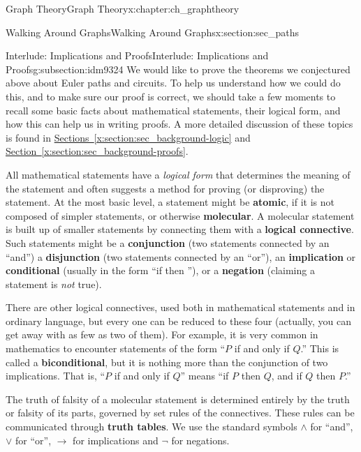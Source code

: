 \documentclass[oneside,10pt,]{book}
\newcommand{\terminology}[1]{\textbf{#1}}
\numberwithin{equation}{chapter}
\def\imp{\rightarrow}
\begin{document}
\begin{chapterptx}{Graph Theory}{}{Graph Theory}{}{}{x:chapter:ch_graphtheory}
\begin{sectionptx}{Walking Around Graphs}{}{Walking Around Graphs}{}{}{x:section:sec_paths}
\typeout{************************************************}
%
\begin{subsectionptx}{Interlude: Implications and Proofs}{}{Interlude: Implications and Proofs}{}{}{g:subsection:idm9324}
We would like to prove the theorems we conjectured above about Euler paths and circuits.  To help us understand how we could do this, and to make sure our proof is correct, we should take a few moments to recall some basic facts about mathematical statements, their logical form, and how this can help us in writing proofs.  A more detailed discussion of these topics is found in \hyperref[x:section:sec_background-logic]{Sections~\ref{x:section:sec_background-logic}} and \hyperref[x:section:sec_background-proofs]{Section~\ref{x:section:sec_background-proofs}}.%
\par
All mathematical statements have a \emph{logical form} that determines the meaning of the statement and often suggests a method for proving (or disproving) the statement.  At the most basic level, a statement might be \terminology{atomic}, if it is not composed of simpler statements, or otherwise \terminology{molecular}.  A molecular statement is built up of smaller statements by connecting them with a \terminology{logical connective}. Such statements might be a \terminology{conjunction} (two statements connected by an ``and'') a \terminology{disjunction} (two statements connected by an ``or''), an \terminology{implication} or \terminology{conditional} (usually in the form ``if \textellipsis{} then \textellipsis{}''), or a \terminology{negation} (claiming a statement is \emph{not} true).%
\par
There are other logical connectives, used both in mathematical statements and in ordinary language, but every one can be reduced to these four (actually, you can get away with as few as two of them).   For example, it is very common in mathematics to encounter statements of the form ``\(P\) if and only if \(Q\).''  This is called a \terminology{biconditional}, but it is nothing more than the conjunction of two implications.  That is, ``\(P\) if and only if \(Q\)'' means ``if \(P\) then \(Q\), and if \(Q\) then \(P\).''%
\par
The truth of falsity of a molecular statement is determined entirely by the truth or falsity of its parts, governed by set rules of the connectives.  These rules can be communicated through \terminology{truth tables}.  We use the standard symbols \(\wedge\) for ``and'', \(\vee\) for ``or'', \(\imp\) for implications and \(\neg\) for negations.%

\end{subsectionptx}
\end{sectionptx}
\end{chapterptx}
\end{document}
